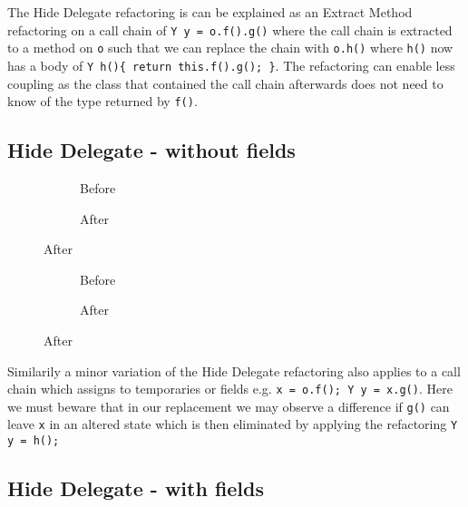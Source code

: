 The Hide Delegate refactoring is can be explained as an Extract Method refactoring on a call chain of \lstinline[style=smallJava]|Y y = o.f().g()| where
the call chain is extracted to a method on \lstinline[style=smallJava]|o| such that we can replace the chain with \lstinline[style=smallJava]|o.h()|
where \lstinline[style=smallJava]|h()| now has a body of \lstinline[style=smallJava]|Y h(){ return this.f().g(); }|. The refactoring can enable less
coupling as the class that contained the call chain afterwards does not need to know of the type returned by \lstinline[style=smallJava]|f()|.

\subsection{Hide Delegate - without fields}

\begin{figure}
  \centering
  \begin{subfigure}{.4\linewidth}
    
    \caption{Before}
  \end{subfigure}\hspace{1cm}
  \begin{subfigure}{.4\linewidth}
    
    \caption{After}
  \end{subfigure}
\label{lst:HideDelegate-refinity}
\end{figure}

\begin{figure}
  \centering
  \begin{subfigure}{.4\linewidth}
    
    \caption{Before}
  \end{subfigure}\hspace{1cm}
  \begin{subfigure}{.4\linewidth}
    
    \caption{After}
  \end{subfigure}
\label{lst:HideDelegate-refinity}
\end{figure}

Similarily a minor variation of the  Hide Delegate refactoring also applies to a call chain which assigns to temporaries or fields
e.g. \lstinline[style=smallJava]|x = o.f(); Y y = x.g()|. Here we must beware that in our replacement we may observe a difference
if \lstinline[style=smallJava]|g()| can leave \lstinline[style=smallJava]|x| in an altered state which is then eliminated by applying
the refactoring \lstinline[style=smallJava]|Y y = h();|

\subsection{Hide Delegate - with fields}

